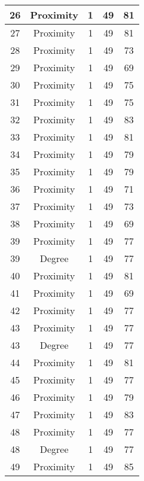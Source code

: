 \documentclass[results.tex]{subfiles}
\begin{document}
\begin{center}
\begin{tabular}{| c || c | c | c | c |}
    \hline
    26 & Proximity & 1 & 49 & 81 \\ 
    \hline
    27 & Proximity & 1 & 49 & 81 \\ 
    \hline
    28 & Proximity & 1 & 49 & 73 \\ 
    \hline
    29 & Proximity & 1 & 49 & 69 \\ 
    \hline
    30 & Proximity & 1 & 49 & 75 \\ 
    \hline
    31 & Proximity & 1 & 49 & 75 \\ 
    \hline
    32 & Proximity & 1 & 49 & 83 \\ 
    \hline
    33 & Proximity & 1 & 49 & 81 \\ 
    \hline
    34 & Proximity & 1 & 49 & 79 \\ 
    \hline
    35 & Proximity & 1 & 49 & 79 \\ 
    \hline
    36 & Proximity & 1 & 49 & 71 \\ 
    \hline
    37 & Proximity & 1 & 49 & 73 \\ 
    \hline
    38 & Proximity & 1 & 49 & 69 \\ 
    \hline
    39 & Proximity & 1 & 49 & 77 \\ 
    \hline
    39 & Degree & 1 & 49 & 77 \\ 
    \hline
    40 & Proximity & 1 & 49 & 81 \\ 
    \hline
    41 & Proximity & 1 & 49 & 69 \\ 
    \hline
    42 & Proximity & 1 & 49 & 77 \\ 
    \hline
    43 & Proximity & 1 & 49 & 77 \\ 
    \hline
    43 & Degree & 1 & 49 & 77 \\ 
    \hline
    44 & Proximity & 1 & 49 & 81 \\ 
    \hline
    45 & Proximity & 1 & 49 & 77 \\ 
    \hline
    46 & Proximity & 1 & 49 & 79 \\ 
    \hline
    47 & Proximity & 1 & 49 & 83 \\ 
    \hline
    48 & Proximity & 1 & 49 & 77 \\ 
    \hline
    48 & Degree & 1 & 49 & 77 \\ 
    \hline
    49 & Proximity & 1 & 49 & 85 \\ 
    \hline   \end{tabular}
\end{center}
\end{document}
